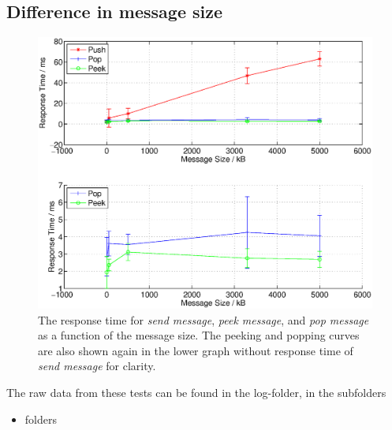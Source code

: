 \documentclass{article}
\begin{document}
        \subsection{Difference in message size}
            \begin{figure}[H]
                    \hspace{-1.5cm}
                    \includegraphics[scale=0.60]{responsetime_msgsize}
                    \caption{The response time for \textit{send message}, \textit{peek message}, and \textit{pop message} as a function of the message size. The peeking and popping curves are also shown again in the lower graph without response time of \textit{send message} for clarity.}
                    \label{fig:responsetime_msgsize}
                \end{figure}
            The raw data from these tests can be found in the log-folder, in the subfolders
            \begin{itemize}
                \item folders
            \end{itemize}
\end{document}
